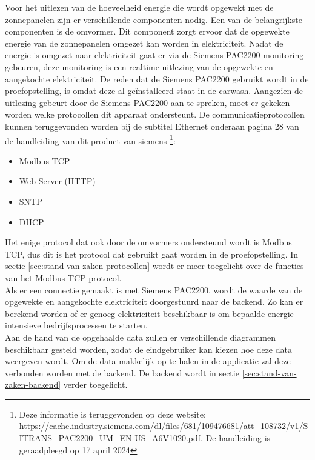 Voor het uitlezen van de hoeveelheid energie die wordt opgewekt met de zonnepanelen zijn er verschillende componenten nodig. Een van de belangrijkste componenten is de omvormer. Dit component zorgt ervoor dat de opgewekte energie van de zonnepanelen omgezet kan worden in elektriciteit. Nadat de energie is omgezet naar elektriciteit gaat er via de Siemens PAC2200 monitoring gebeuren, deze monitoring is een realtime uitlezing van de opgewekte en aangekochte elektriciteit. De reden dat de Siemens PAC2200 gebruikt wordt in de proefopstelling, is omdat deze al geïnstalleerd staat in de carwash. Aangezien de uitlezing gebeurt door de Siemens PAC2200 aan te spreken, moet er gekeken worden welke protocollen dit apparaat ondersteunt. De communicatieprotocollen  kunnen teruggevonden worden bij de subtitel Ethernet onderaan pagina 28 van de handleiding van dit product van siemens \footnote{Deze informatie is teruggevonden op deze website: \url{https://cache.industry.siemens.com/dl/files/681/109476681/att_108732/v1/SITRANS_PAC2200_UM_EN-US_A6V1020.pdf}. De handleiding is geraadpleegd op 17 april 2024}:

\begin{itemize}
    \item Modbus TCP
    \item Web Server (HTTP)
    \item SNTP
    \item DHCP
\end{itemize}

Het enige protocol dat ook door de omvormers ondersteund wordt is Modbus TCP, dus dit is het protocol dat gebruikt gaat worden in de proefopstelling. In sectie \ref{sec:stand-van-zaken-protocollen} wordt er meer toegelicht over de functies van het Modbus TCP protocol.\\

Als er een connectie gemaakt is met Siemens PAC2200, wordt de waarde van de opgewekte en aangekochte elektriciteit doorgestuurd naar de backend. Zo kan er berekend worden of er genoeg elektriciteit beschikbaar is om bepaalde energie-intensieve bedrijfsprocessen te starten.\\

Aan de hand van de opgehaalde data zullen er verschillende diagrammen beschikbaar gesteld worden, zodat de eindgebruiker kan kiezen hoe deze data weergeven wordt. Om de data makkelijk op te halen in de applicatie zal deze verbonden worden met de backend. De backend wordt in sectie \ref{sec:stand-van-zaken-backend} verder toegelicht.

